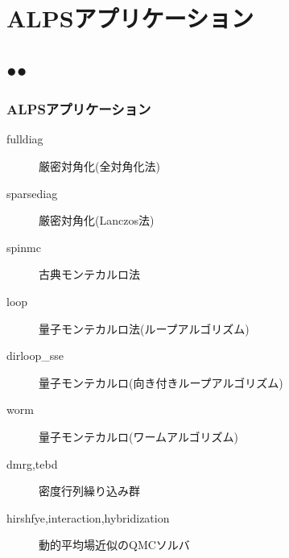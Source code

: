

\section{ALPSアプリケーション}
\subsection*{{\protect\color{red}●}{\protect\color{blue}●}}

\begin{frame}
  \frametitle{ALPSアプリケーション}
  \begin{description}
  \item[fulldiag] {\color{red} 厳密対角化(全対角化法)}
  \item[sparsediag] {\color{red} 厳密対角化(Lanczos法)}
  \item[spinmc] 古典モンテカルロ法
  \item[loop] {\color{red} 量子モンテカルロ法(ループアルゴリズム)}
  \item[dirloop\_sse] {\color{red} 量子モンテカルロ(向き付きループアルゴリズム)}
  \item[worm] 量子モンテカルロ(ワームアルゴリズム)
  \item[dmrg,tebd] 密度行列繰り込み群
  \item[hirshfye,interaction,hybridization] 動的平均場近似のQMCソルバ
  \end{description}
\end{frame}

